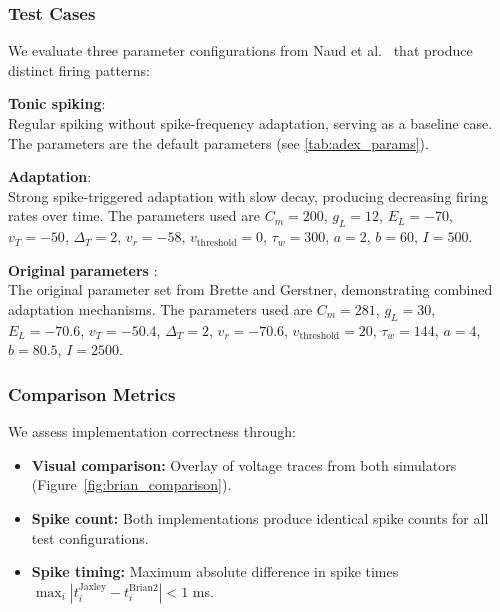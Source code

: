 \documentclass[conference]{IEEEtran}
\begin{document}
\subsubsection{Test Cases}
We evaluate three parameter configurations from Naud et al.\ \cite{Naud2008} that produce distinct firing patterns:

\textbf{Tonic spiking}:\\
Regular spiking without spike-frequency adaptation, serving as a baseline case.
The parameters are the default parameters (see \ref{tab:adex_params}).

\textbf{Adaptation}:\\
Strong spike-triggered adaptation with slow decay, producing decreasing firing rates over time.
The parameters used are
$C_m = 200$,
$g_L = 12$,
$E_L = -70$,
$v_T = -50$,
$\Delta_T = 2$,
$v_r = -58$,
$v_{\text{threshold}} = 0$,
$\tau_w = 300$,
$a = 2$,
$b = 60$,
$I = 500$.

\textbf{Original parameters} \cite{Brette2005}:\\
The original parameter set from Brette and Gerstner, demonstrating combined adaptation mechanisms.
The parameters used are
$C_m = 281$,
$g_L = 30$,
$E_L = -70.6$,
$v_T = -50.4$,
$\Delta_T = 2$,
$v_r = -70.6$,
$v_{\text{threshold}} = 20$,
$\tau_w = 144$,
$a = 4$,
$b = 80.5$,
$I = 2500$.

\subsubsection{Comparison Metrics}\label{sec:comparison-metrics}
We assess implementation correctness through:
\begin{itemize}
  \item \textbf{Visual comparison:} Overlay of voltage traces from both simulators (Figure~\ref{fig:brian_comparison}).
  \item \textbf{Spike count:} Both implementations produce identical spike counts for all test configurations.
  \item \textbf{Spike timing:} Maximum absolute difference in spike times $\max_i |t_i^{\text{Jaxley}} - t_i^{\text{Brian2}}| < 1$ ms.
\end{itemize}
\end{document}
